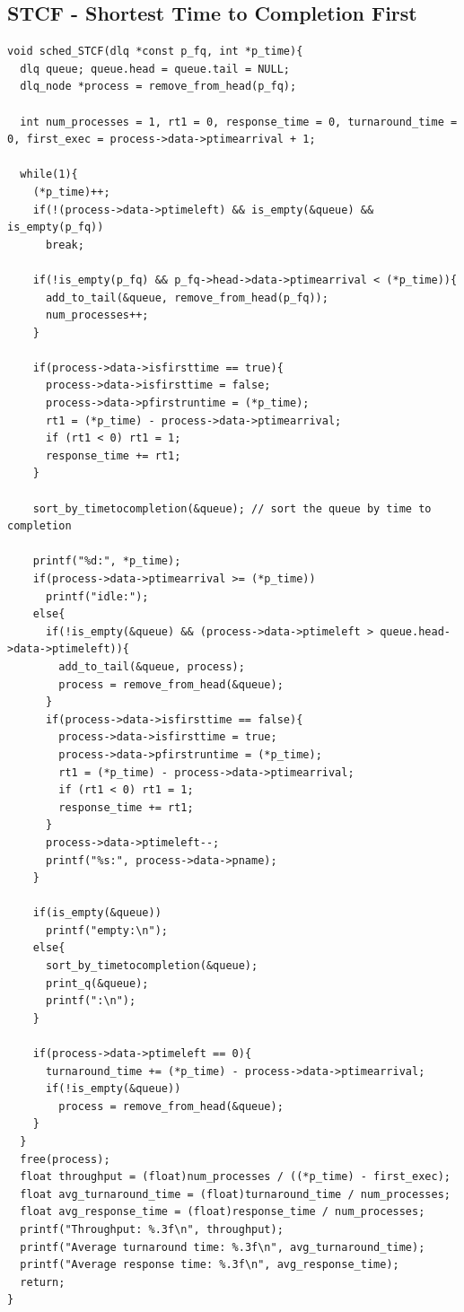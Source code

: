 \documentclass{article}
\theoremstyle{mytheoremstyle}
\theoremstyle{mytheoremstyle}
\theoremstyle{myproblemstyle}
\begin{document}
\subsection{STCF - Shortest Time to Completion First}
\begin{lstlisting}[caption={STCF Scheduling Algorithm},label={lst:stcf}]
void sched_STCF(dlq *const p_fq, int *p_time){
  dlq queue; queue.head = queue.tail = NULL;
  dlq_node *process = remove_from_head(p_fq);

  int num_processes = 1, rt1 = 0, response_time = 0, turnaround_time = 0, first_exec = process->data->ptimearrival + 1;

  while(1){
    (*p_time)++;
    if(!(process->data->ptimeleft) && is_empty(&queue) && is_empty(p_fq))
      break;

    if(!is_empty(p_fq) && p_fq->head->data->ptimearrival < (*p_time)){
      add_to_tail(&queue, remove_from_head(p_fq));
      num_processes++;
    }

    if(process->data->isfirsttime == true){
      process->data->isfirsttime = false;
      process->data->pfirstruntime = (*p_time);
      rt1 = (*p_time) - process->data->ptimearrival;
      if (rt1 < 0) rt1 = 1;
      response_time += rt1;
    }

    sort_by_timetocompletion(&queue); // sort the queue by time to completion

    printf("%d:", *p_time);
    if(process->data->ptimearrival >= (*p_time))
      printf("idle:");
    else{
      if(!is_empty(&queue) && (process->data->ptimeleft > queue.head->data->ptimeleft)){
        add_to_tail(&queue, process);
        process = remove_from_head(&queue);
      }
      if(process->data->isfirsttime == false){
        process->data->isfirsttime = true;
        process->data->pfirstruntime = (*p_time);
        rt1 = (*p_time) - process->data->ptimearrival;
        if (rt1 < 0) rt1 = 1;
        response_time += rt1;
      }
      process->data->ptimeleft--;
      printf("%s:", process->data->pname);
    }

    if(is_empty(&queue))
      printf("empty:\n");
    else{
      sort_by_timetocompletion(&queue);
      print_q(&queue);
      printf(":\n");
    }

    if(process->data->ptimeleft == 0){
      turnaround_time += (*p_time) - process->data->ptimearrival;
      if(!is_empty(&queue))
        process = remove_from_head(&queue);
    }
  }
  free(process);
  float throughput = (float)num_processes / ((*p_time) - first_exec);
  float avg_turnaround_time = (float)turnaround_time / num_processes;
  float avg_response_time = (float)response_time / num_processes;
  printf("Throughput: %.3f\n", throughput);
  printf("Average turnaround time: %.3f\n", avg_turnaround_time);
  printf("Average response time: %.3f\n", avg_response_time);
  return;
}
\end{lstlisting}
\end{document}
